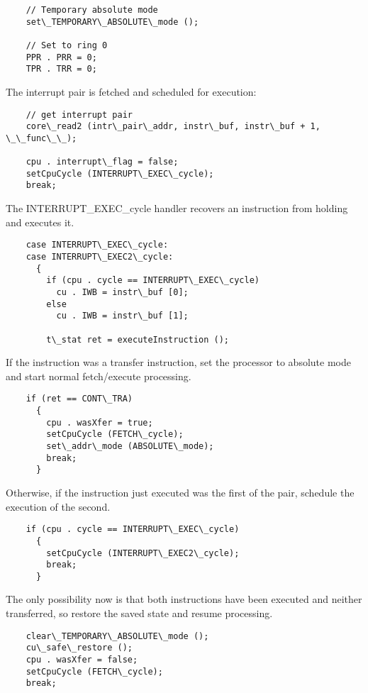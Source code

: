 \documentclass[notitlepage]{report}
\begin{document}
\begin{verbatim}
    // Temporary absolute mode
    set\_TEMPORARY\_ABSOLUTE\_mode ();

    // Set to ring 0
    PPR . PRR = 0;
    TPR . TRR = 0;
\end{verbatim}

The interrupt pair is fetched and scheduled for execution:

\begin{verbatim}
    // get interrupt pair
    core\_read2 (intr\_pair\_addr, instr\_buf, instr\_buf + 1, \_\_func\_\_);

    cpu . interrupt\_flag = false;
    setCpuCycle (INTERRUPT\_EXEC\_cycle);
    break;
\end{verbatim}

The INTERRUPT\_EXEC\_cycle handler recovers an instruction from holding and executes it.

\begin{verbatim}
    case INTERRUPT\_EXEC\_cycle:
    case INTERRUPT\_EXEC2\_cycle:
      {
        if (cpu . cycle == INTERRUPT\_EXEC\_cycle)
          cu . IWB = instr\_buf [0];
        else
          cu . IWB = instr\_buf [1];

        t\_stat ret = executeInstruction ();
\end{verbatim}

If the instruction was a transfer instruction, set the processor to absolute mode and start
normal fetch/execute processing.

\begin{verbatim}
    if (ret == CONT\_TRA)
      {
        cpu . wasXfer = true;
        setCpuCycle (FETCH\_cycle);
        set\_addr\_mode (ABSOLUTE\_mode);
        break;
      }
\end{verbatim}

Otherwise, if the instruction just executed was the first of the pair, schedule the execution of
the second.

\begin{verbatim}
    if (cpu . cycle == INTERRUPT\_EXEC\_cycle)
      {
        setCpuCycle (INTERRUPT\_EXEC2\_cycle);
        break;
      }
\end{verbatim}

The only possibility now is that both instructions have been executed and neither transferred, so restore
the saved state and resume processing.

\begin{verbatim}
    clear\_TEMPORARY\_ABSOLUTE\_mode ();
    cu\_safe\_restore ();
    cpu . wasXfer = false;
    setCpuCycle (FETCH\_cycle);
    break;
\end{verbatim}
 
\end{document}
